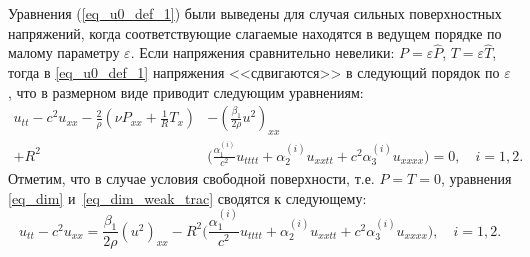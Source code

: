 \documentclass[12pt, a4paper]{report}
\begin{document}
Уравнения (\ref{eq_u0_def_1}) были выведены для случая сильных поверхностных напряжений, когда соответствующие слагаемые находятся в ведущем порядке по малому параметру $\varepsilon$. Если напряжения сравнительно невелики:
$P = \varepsilon \hat P$, $T = \varepsilon \hat T$,
тогда в \eqref{eq_u0_def_1} напряжения <<сдвигаются>> в следующий порядок по $\varepsilon$, что в размерном виде приводит следующим уравнениям:
\begin{equation}\label{eq_dim_weak_trac}
\begin{split}
u_{tt} - c^2 u_{xx} - \frac{2}{\rho}\left(\nu P_{xx} + \frac1R T_x\right)  &- \left(\frac{\beta_1}{2\rho} u^2 \right)_{xx} \\
+ R^2& \bigg(\frac{\alpha_1^{(i)}}{c^2} u_{tttt} + \alpha_2^{(i)} u_{xxtt} + c^2\alpha_3^{(i)} u_{xxxx}  \bigg) = 0, \quad i = 1,2.
\end{split}
\end{equation}
Отметим, что в случае условия свободной поверхности, т.е. $P = T = 0$, уравнения \eqref{eq_dim} и~\eqref{eq_dim_weak_trac} сводятся к следующему:
\begin{equation}\label{eq_dim_free_surf}
u_{tt} - c^2 u_{xx} = \frac{\beta_1}{2\rho}\left(u^2\right)_{xx} -  R^2 \bigg(\frac{\alpha_1^{(i)}}{c^2} u_{tttt} + \alpha_2^{(i)} u_{xxtt} + c^2\alpha_3^{(i)} u_{xxxx}\bigg), \quad i = 1,2.
\end{equation}
\end{document}
